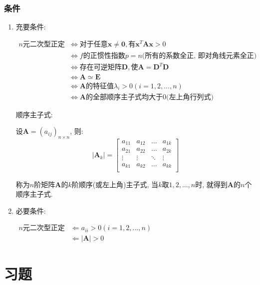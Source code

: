 \subsubsection{条件}
\begin{enumerate}
\item 充要条件: \par $ \begin{aligned}
                   n\text{元二次型正定} & \Leftrightarrow \text{对于任意}\bm{x}\neq \bm{0}, \text{有}\bm{x}^{T}\bm{A}\bm{x}>0 \\
                   & \Leftrightarrow f\text{的正惯性指数} p=n\text{(所有的系数全正, 即对角线元素全正)} \\
                   & \Leftrightarrow \text{存在可逆矩阵} \bm{D}, \text{使} \bm{A}=\bm{D}^{T}\bm{D} \\
                   & \Leftrightarrow \bm{A}\simeq \bm{E} \\
                   & \Leftrightarrow \bm{A}\text{的特征值} \lambda_{i}>0(i=1, 2,... ,n) \\
                   & \Leftrightarrow \bm{A}\text{的全部顺序主子式均大于0(左上角行列式)}
\end{aligned} $ \par
顺序主子式: \par
设$\bm{A}=(a_{ij})_{n\times n}$, 则:
\begin{equation*}
|\bm{A}_{k}|=
\begin{bmatrix}
a_{11} & a_{12} & \dots & a_{1k} \\
a_{21} & a_{22} & \dots & a_{2k} \\
\vdots & \vdots & \ddots & \vdots \\
a_{k1} & a_{k2} & \dots & a_{kk} \\
\end{bmatrix}
\end{equation*} \par
称为$n$阶矩阵$\bm{A}$的$k$阶顺序(或左上角)主子式, 当$k$取$1,2,...,n$时, 就得到$\bm{A}$的$n$个顺序主子式.
\item 必要条件: \par $ \begin{aligned}
                   n\text{元二次型正定} & \Leftarrow a_{ii}>0(i=1, 2,... ,n) \\
                   & \Leftarrow \left|\bm{A}\right|>0
\end{aligned} $
\end{enumerate}
\section{习题}
